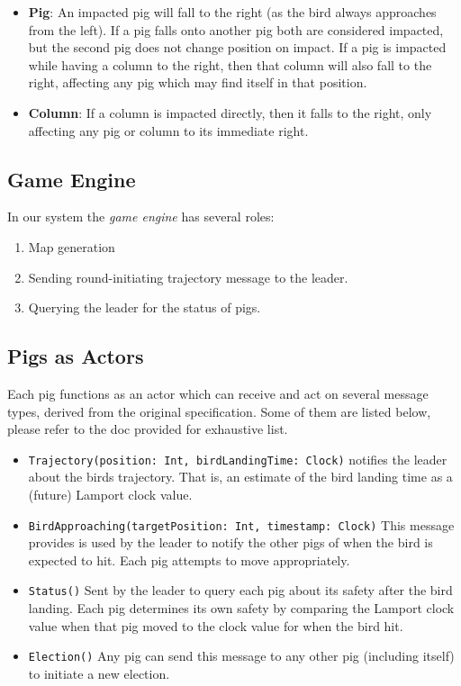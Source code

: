 \documentclass[]{article}
\begin{document}
\begin{itemize}
\item
  \textbf{Pig}: An impacted pig will fall to the right (as the bird
  always approaches from the left). If a pig falls onto another pig both
  are considered impacted, but the second pig does not change position
  on impact. If a pig is impacted while having a column to the right,
  then that column will also fall to the right, affecting any pig which
  may find itself in that position.
\item
  \textbf{Column}: If a column is impacted directly, then it falls to
  the right, only affecting any pig or column to its immediate right.
\end{itemize}

\subsection{Game Engine}

In our system the \emph{game engine} has several roles:

\begin{enumerate}[1.]
\item
  Map generation
\item
  Sending round-initiating trajectory message to the leader.
\item
  Querying the leader for the status of pigs. 
\end{enumerate}

\subsection{Pigs as Actors}

Each pig functions as an actor which can receive and act on several
message types, derived from the original specification. Some of them are listed below,
please refer to the doc provided for exhaustive list.

\begin{itemize}
\item
  \texttt{Trajectory(position: Int, birdLandingTime: Clock)} notifies the leader about the birds trajectory. That is, an estimate of the bird landing time as a (future) Lamport clock value.
\item
  \texttt{BirdApproaching(targetPosition: Int, timestamp: Clock)} This message provides is used by the leader to notify the other pigs of when the bird is expected to hit. Each pig attempts to move appropriately.
\item
  \texttt{Status()} Sent by the leader to query each pig about its safety after the bird landing. Each pig determines its own safety by comparing the Lamport clock value when that pig moved to the clock value for when the bird hit.
\item
  \texttt{Election()} Any pig can send this message to any other pig (including itself) to initiate a new election.
\end{itemize}
\end{document}
